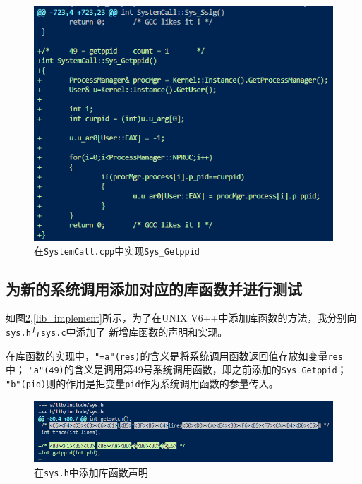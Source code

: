 \begin{figure}[!htbp]
    \centering
    \includegraphics[scale=1]{images/implementaion.png}
    \caption{在\texttt{SystemCall.cpp}中实现\texttt{Sys\_Getppid}}\label{implementaion}
\end{figure}


\subsection{为新的系统调用添加对应的库函数并进行测试}

如图\ref{lib_declear},\ref{lib_implement}所示，为了在UNIX V6++中添加库函数的方法，我分别向\texttt{sys.h}与\texttt{sys.c}中添加了
新增库函数的声明和实现。

在库函数的实现中，\texttt{"=a"(res)}的含义是将系统调用函数返回值存放如变量\texttt{res}中；
\texttt{"a"(49)}的含义是调用第49号系统调用函数，即之前添加的\texttt{Sys\_Getppid}；
\texttt{"b"(pid)}则的作用是把变量\texttt{pid}作为系统调用函数的参量传入。

\begin{figure}[!htbp]
    \centering
    \includegraphics[width=\textwidth]{images/lib_declear.png}
    \caption{在\texttt{sys.h}中添加库函数声明}\label{lib_declear}
\end{figure}

